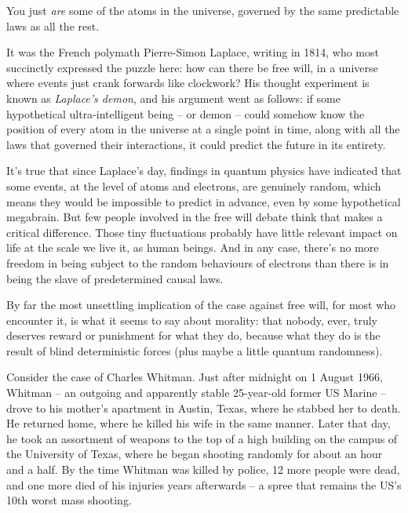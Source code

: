 \documentclass[
]{book}
\begin{document}
You just \emph{are} some of the atoms in the universe, governed by the same predictable laws as all the rest.

It was the French polymath Pierre-Simon Laplace, writing in 1814, who most succinctly expressed the puzzle here: how can there be free will, in a universe where events just crank forwards like clockwork? His thought experiment is known as \emph{Laplace's demon}, and his argument went as follows: if some hypothetical ultra-intelligent being -- or demon -- could somehow know the position of every atom in the universe at a single point in time, along with all the laws that governed their interactions, it could predict the future in its entirety.

It's true that since Laplace's day, findings in quantum physics have indicated that some events, at the level of atoms and electrons, are genuinely random, which means they would be impossible to predict in advance, even by some hypothetical megabrain. But few people involved in the free will debate think that makes a critical difference. Those tiny fluctuations probably have little relevant impact on life at the scale we live it, as human beings. And in any case, there's no more freedom in being subject to the random behaviours of electrons than there is in being the slave of predetermined causal laws.

By far the most unsettling implication of the case against free will, for most who encounter it, is what it seems to say about morality: that nobody, ever, truly deserves reward or punishment for what they do, because what they do is the result of blind deterministic forces (plus maybe a little quantum randomness).

Consider the case of Charles Whitman. Just after midnight on 1 August 1966, Whitman -- an outgoing and apparently stable 25-year-old former US Marine -- drove to his mother's apartment in Austin, Texas, where he stabbed her to death. He returned home, where he killed his wife in the same manner. Later that day, he took an assortment of weapons to the top of a high building on the campus of the University of Texas, where he began shooting randomly for about an hour and a half. By the time Whitman was killed by police, 12 more people were dead, and one more died of his injuries years afterwards -- a spree that remains the US's 10th worst mass shooting.
\end{document}
